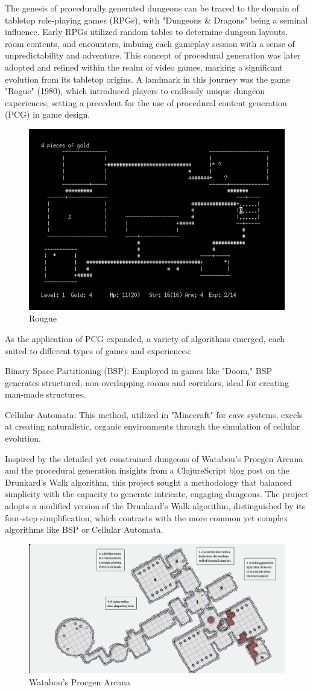 \documentclass[10pt,twocolumn]{article}
\begin{document}
The genesis of procedurally generated dungeons can be traced to the domain of tabletop role-playing games (RPGs), with "Dungeons & Dragons" being a seminal influence. Early RPGs utilized random tables to determine dungeon layouts, room contents, and encounters, imbuing each gameplay session with a sense of unpredictability and adventure. This concept of procedural generation was later adopted and refined within the realm of video games, marking a significant evolution from its tabletop origins. A landmark in this journey was the game "Rogue" (1980), which introduced players to endlessly unique dungeon experiences, setting a precedent for the use of procedural content generation (PCG) in game design.\cite{Holmes2020Rogue}
\begin{figure}
    \centering
    \includegraphics[width=0.5\linewidth]{rougue.PNG}
    \caption{Rougue}
    \label{fig:enter-label}
\end{figure}

As the application of PCG expanded, a variety of algorithms emerged, each suited to different types of games and experiences:

Binary Space Partitioning (BSP): Employed in games like "Doom," BSP generates structured, non-overlapping rooms and corridors, ideal for creating man-made structures.\cite{TwoBitHistory2019DoomBSP}

Cellular Automata: This method, utilized in "Minecraft" for cave systems, excels at creating naturalistic, organic environments through the simulation of cellular evolution.\cite{HeardProceduralDungeonCA}

Inspired by the detailed yet constrained dungeons of Watabou's Procgen Arcana and the procedural generation insights from a ClojureScript blog post on the Drunkard’s Walk algorithm, this project sought a methodology that balanced simplicity with the capacity to generate intricate, engaging dungeons. The project adopts a modified version of the Drunkard’s Walk algorithm, distinguished by its four-step simplification, which contrasts with the more common yet complex algorithms like BSP or Cellular Automata.
\begin{figure}
    \centering
    \includegraphics[width=0.5\linewidth]{watab.png}
    \caption{Watabou's Procgen Arcana}
    \label{fig:enter-label}
\end{figure}
\end{document}
